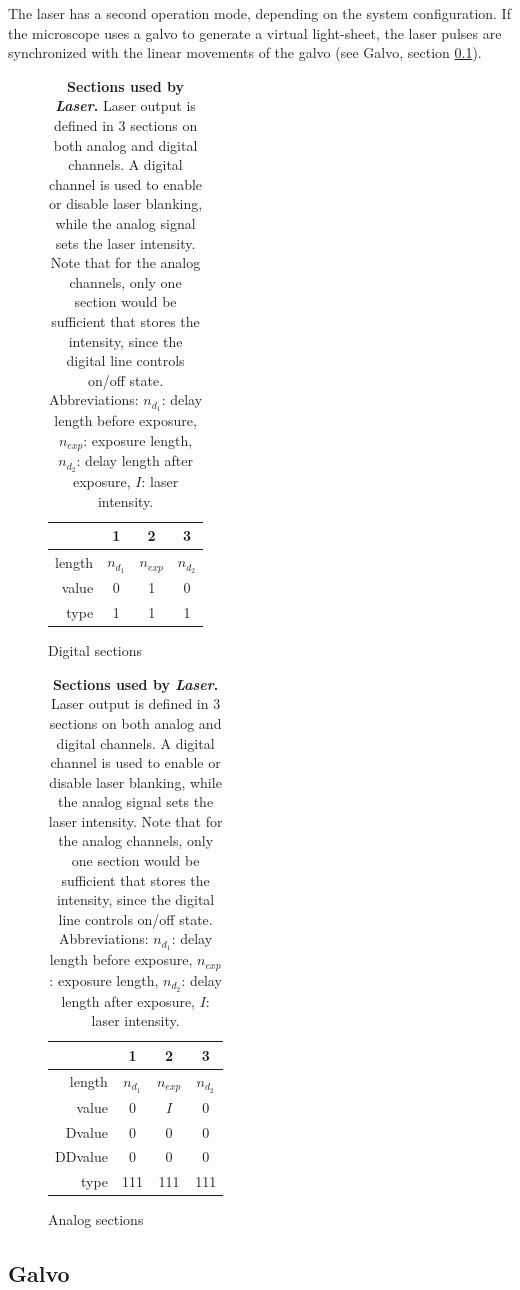 \documentclass{diploma_style}
\begin{document}
The laser has a second operation mode, depending on the system configuration. If the microscope uses a galvo to generate a virtual light-sheet, the laser pulses are synchronized with the linear movements of the galvo (see Galvo, section \ref{galvo}).

\begin{table}[htb]
\centering
\begin{subfigure}[h]{0.49\textwidth}
\centering
\begin{tabular}{r|c|c|c}
			& 1 & 2 & 3\\ \hline \hline
	length  & $n_{d_1}$ & $n_{exp}$ & $n_{d_2}$ \\
	value   & 0 & 1 & 0  \\
	type  & 1 & 1 & 1\\
\end{tabular}
\caption{Digital sections}
\end{subfigure}
\begin{subfigure}[h]{0.490\textwidth}
\centering
\begin{tabular}{r|c|c|c}
			& 1 & 2 & 3\\ \hline \hline
	length  & $n_{d_1}$ & $n_{exp}$ & $n_{d_2}$ \\
	value   & 0 & $I$ & 0  \\
	Dvalue  & 0 & 0 & 0 \\
	DDvalue & 0 & 0 & 0 \\
	type    & 111 & 111 & 111 \\
\end{tabular}
\caption{Analog sections}
\end{subfigure}
\caption{\textbf{Sections used by \emph{Laser}.} Laser output is defined in 3 sections on both analog and digital channels. A digital channel is used to enable or disable laser blanking, while the analog signal sets the laser intensity. Note that for the analog channels, only one section would be sufficient that stores the intensity, since the digital line controls on/off state. Abbreviations: $n_{d_1}$: delay length before exposure, $n_{exp}$: exposure length, $n_{d_2}$: delay length after exposure, $I$: laser intensity.}
\label{tab:laser}
\end{table}




\subsection{Galvo}
\label{galvo}
\end{document}
